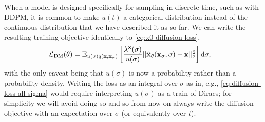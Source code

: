 When a model is designed specifically for sampling in discrete-time, such as with DDPM, it is common to make $u(t)$ a categorical distribution instead of the continuous distribution that we have described it as so far. 
We can write the resulting training objective identically to \cref{eq:x0-diffusion-loss},
\begin{align}
    \mathcal{L}_\text{DM}(\theta) &= \mathbb{E}_{u(\sigma)q({\mathbf{x}}, {\mathbf{x}}_\sigma)} \left[ \frac{\lambda^{\mathbf{x}}(\sigma)}{u(\sigma)} 
    || \hat{{\mathbf{x}}}_\theta({\mathbf{x}}_\sigma, \sigma) - {\mathbf{x}} ||_2^2 \right] \mathrm{d}\sigma,
\end{align}
with the only caveat being that $u(\sigma)$ is now a probability rather than a probability density. Writing the loss as an integral over $\sigma$ as in, e.g., \cref{eq:diffusion-loss-all-sigma} would require interpreting $u(\sigma)$ as a train of Diracs; for simplicity we will avoid doing so and so from now on always write the diffusion objective with an expectation over $\sigma$ (or equivalently over $t$).

